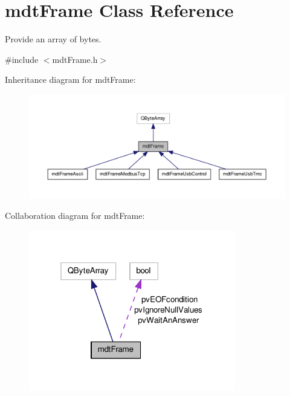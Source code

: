 \hypertarget{classmdt_frame}{\section{mdt\-Frame Class Reference}
\label{classmdt_frame}
}


Provide an array of bytes.  




{\ttfamily \#include $<$mdt\-Frame.\-h$>$}



Inheritance diagram for mdt\-Frame\-:\nopagebreak
\begin{figure}[H]
\begin{center}
\leavevmode
\includegraphics[width=350pt]{classmdt_frame__inherit__graph}
\end{center}
\end{figure}


Collaboration diagram for mdt\-Frame\-:\nopagebreak
\begin{figure}[H]
\begin{center}
\leavevmode
\includegraphics[width=256pt]{classmdt_frame__coll__graph}
\end{center}
\end{figure}
